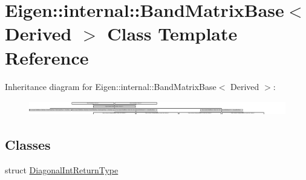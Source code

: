 \hypertarget{class_eigen_1_1internal_1_1_band_matrix_base}{}\section{Eigen\+:\+:internal\+:\+:Band\+Matrix\+Base$<$ Derived $>$ Class Template Reference}
\label{class_eigen_1_1internal_1_1_band_matrix_base}
Inheritance diagram for Eigen\+:\+:internal\+:\+:Band\+Matrix\+Base$<$ Derived $>$\+:\begin{figure}[H]
\begin{center}
\leavevmode
\includegraphics[height=0.634921cm]{class_eigen_1_1internal_1_1_band_matrix_base}
\end{center}
\end{figure}
\subsection*{Classes}
\begin{DoxyCompactItemize}
\item 
struct \hyperlink{struct_eigen_1_1internal_1_1_band_matrix_base_1_1_diagonal_int_return_type}{Diagonal\+Int\+Return\+Type}
\end{DoxyCompactItemize}
